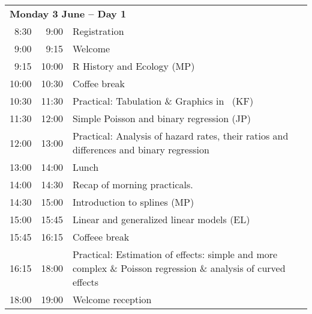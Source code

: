 \documentclass[a4paper, 12pt]{article}
\begin{document}
\noindent
\begin{tabular}{r@{ -- }rp{13cm}}
\multicolumn{3}{l}{\bf Monday 3 June -- Day 1} \\
 8:30 &  9:00 & Registration \\
 9:00 &  9:15 & Welcome  \\
 9:15 & 10:00 & R History and Ecology (MP)\\%
10:00 & 10:30 & Coffee break \\
10:30 & 11:30 & Practical: Tabulation \& Graphics in \R\ (KF)\\ %
11:30 & 12:00 & Simple Poisson and binary regression (JP)\\ %
12:00 & 13:00 & Practical: Analysis of hazard rates, their ratios and differences and binary regression\\
13:00 & 14:00 & Lunch \\
14:00 &  14:30 & Recap of morning practicals. \\
14:30 & 15:00 & Introduction to splines (MP)\\ %
15:00 & 15:45 & Linear and generalized linear models (EL)\\ %
15:45 & 16:15 & Coffeee break \\
16:15 & 18:00 & Practical:  Estimation of effects: simple and more complex \& Poisson regression \& analysis of curved effects\\ %
18:00 & 19:00 & Welcome reception  \\[1em]
\end{tabular}
\end{document}
